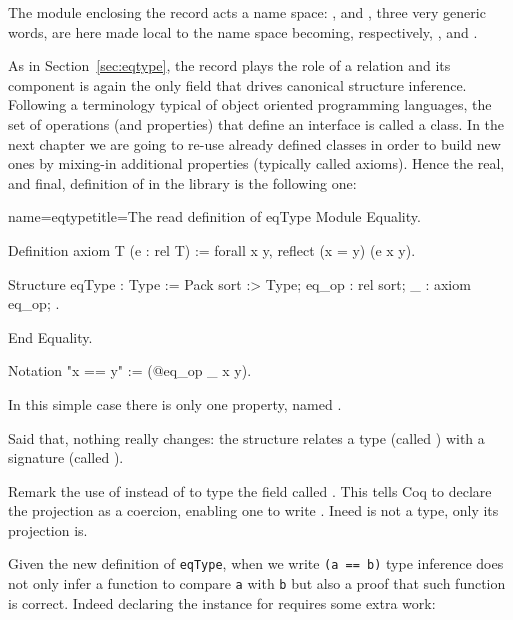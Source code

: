 
The  module enclosing the record acts a name space: ,
 and , three very generic words, are here
made local to the  name space becoming, respectively,
,  and .

As in Section~\ref{sec:eqtype}, the record plays the role of
a relation and its  component is again the only field
that drives canonical structure inference. Following
a terminology typical of object oriented programming languages,
the set of operations (and properties) that define an interface is
called a class.  In the next chapter we are going to re-use already
defined classes in order to build new ones by mixing-in additional
properties (typically called axioms).
Hence the real, and final, definition of  in the
\mcbMC{} library is the following one:

\begin{coq}{name=eqtype}{title=The read definition of eqType}
Module Equality.

Definition axiom T (e : rel T) := forall x y, reflect (x = y) (e x y).

Structure eqType : Type := Pack {
  sort :> Type;
  eq_op : rel sort;
  _ : axiom eq_op;
}.

End Equality.

Notation "x == y" := (@eq_op _ x y).
\end{coq}

In this simple case there is only one property, named
.

Said that, nothing really changes: the  structure
relates a type (called ) with a signature (called ).

Remark the use of \C{:>} instead of \C{:} to type the
field called .  This tells Coq to declare the
 projection
as a coercion, enabling one to write .  Ineed  is not a type, only its  projection is.

Given the new definition of \lstinline/eqType/,
when we write \lstinline/(a == b)/ type inference does not only infer
a function to compare \lstinline/a/ with \lstinline/b/ but also a
proof that such function is correct.
Indeed declaring the  instance for  requires some
extra work:

